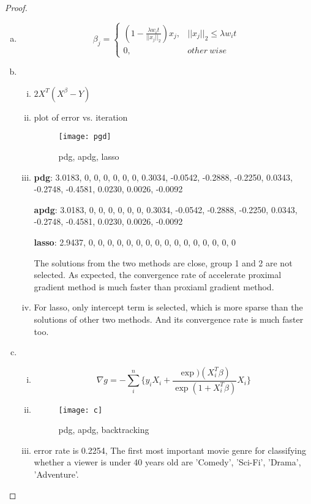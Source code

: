 \documentclass{article}
\theoremstyle{remark}
\theoremstyle{definition}
\begin{document}
\begin{proof}
\begin{enumerate}[(a)]
    \item \begin{equation*}
      \beta_j=\begin{cases}
          (1-\frac{\lambda w_i t}{||x_j||_2})x_j,& ||x_j||_2\leq \lambda w_i t\\
          0, & other~wise
        \end{cases}\end{equation*}
        \item \begin{enumerate}[(i)]
            \item $2X^T(X^\beta-Y)$

            \item plot of error vs. iteration 
            \begin{figure}[H]
  \centering
\texttt{[image: pgd]}
  \caption[]
   { pdg, apdg, lasso}
\end{figure}
\item  

\textbf{pdg}: 3.0183,
         0,
         0,
         0,
         0,
         0,
         0,
    0.3034,
   -0.0542,
   -0.2888,
   -0.2250,
    0.0343,
   -0.2748,
   -0.4581,
    0.0230,
    0.0026,
   -0.0092

\textbf{apdg}: 3.0183,
         0,
         0,
         0,
         0,
         0,
         0,
    0.3034,
   -0.0542,
   -0.2888,
   -0.2250,
    0.0343,
   -0.2748,
   -0.4581,
    0.0230,
    0.0026,
   -0.0092

\textbf{lasso}: 2.9437,
         0,
         0,
         0,
         0,
         0,
         0,
         0,
         0,
         0,
         0,
         0,
         0,
         0,
         0,
         0,
         0

The solutions from the two methods are close,  group 1 and 2 are not selected. As expected, the convergence rate of accelerate proximal gradient method is much faster than proxiaml gradient method.
\item  For lasso, only intercept term is selected, which is more sparse than the solutions of other two methods. And its convergence rate is much faster too.
\end{enumerate}
\item 
\begin{enumerate}[(i)]
    \item \[\nabla g = -\sum_i^n\{ y_iX_i+\frac{\exp)(X_i^T\beta)}{\exp(1+X_i^T\beta)}X_i\}\]
    \item \begin{figure}[H]
  \centering
\texttt{[image: c]}
  \caption[]
   { pdg, apdg, backtracking}
\end{figure}
\item error rate is 0.2254, The first most important movie genre for classifying whether a viewer is under 40 years old are 
    'Comedy', 'Sci-Fi', 'Drama',  'Adventure'.
\end{enumerate}
\end{enumerate}

\end{proof}
\end{document}
